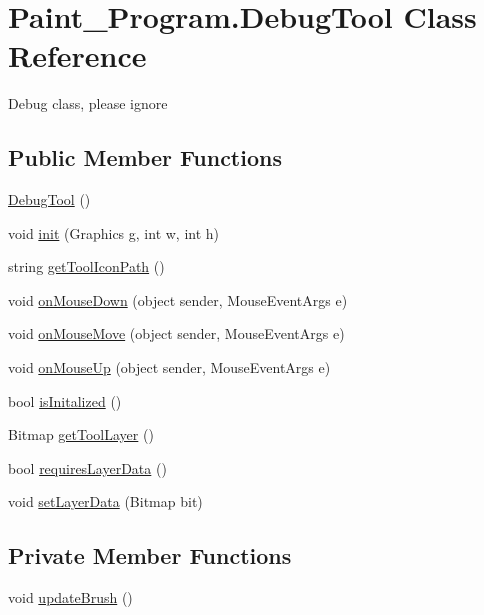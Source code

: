 \hypertarget{class_paint___program_1_1_debug_tool}{}\section{Paint\+\_\+\+Program.\+Debug\+Tool Class Reference}
\label{class_paint___program_1_1_debug_tool}


Debug class, please ignore  


\subsection*{Public Member Functions}
\begin{DoxyCompactItemize}
\item 
\mbox{\hyperlink{class_paint___program_1_1_debug_tool_a69b23aa29a8e6a7eda899f8b0c06a30a}{Debug\+Tool}} ()
\item 
void \mbox{\hyperlink{class_paint___program_1_1_debug_tool_abb9b13e0ee7ebd2ae519954d1b7b25bc}{init}} (Graphics g, int w, int h)
\item 
string \mbox{\hyperlink{class_paint___program_1_1_debug_tool_a2fc17119627d456392edbacde3cfd777}{get\+Tool\+Icon\+Path}} ()
\item 
void \mbox{\hyperlink{class_paint___program_1_1_debug_tool_a4487357b5b4f13df8e2d5b1dea58b4b1}{on\+Mouse\+Down}} (object sender, Mouse\+Event\+Args e)
\item 
void \mbox{\hyperlink{class_paint___program_1_1_debug_tool_ad42116d6b06599d09e512a69508374e5}{on\+Mouse\+Move}} (object sender, Mouse\+Event\+Args e)
\item 
void \mbox{\hyperlink{class_paint___program_1_1_debug_tool_ae7992dec38b867467945acaf5a534788}{on\+Mouse\+Up}} (object sender, Mouse\+Event\+Args e)
\item 
bool \mbox{\hyperlink{class_paint___program_1_1_debug_tool_a151b487b28d6473d9e19fc5f3b0ef794}{is\+Initalized}} ()
\item 
Bitmap \mbox{\hyperlink{class_paint___program_1_1_debug_tool_ae253e13e230722216dd52b6495d2095c}{get\+Tool\+Layer}} ()
\item 
bool \mbox{\hyperlink{class_paint___program_1_1_debug_tool_a3a65762371dc6be5036dd2bb1cb15c68}{requires\+Layer\+Data}} ()
\item 
void \mbox{\hyperlink{class_paint___program_1_1_debug_tool_af32071c87b23b3be49903dd92fe374b5}{set\+Layer\+Data}} (Bitmap bit)
\end{DoxyCompactItemize}
\subsection*{Private Member Functions}
\begin{DoxyCompactItemize}
\item 
void \mbox{\hyperlink{class_paint___program_1_1_debug_tool_a269e245b70de5839910bc69c77dfebf3}{update\+Brush}} ()
\end{DoxyCompactItemize}
